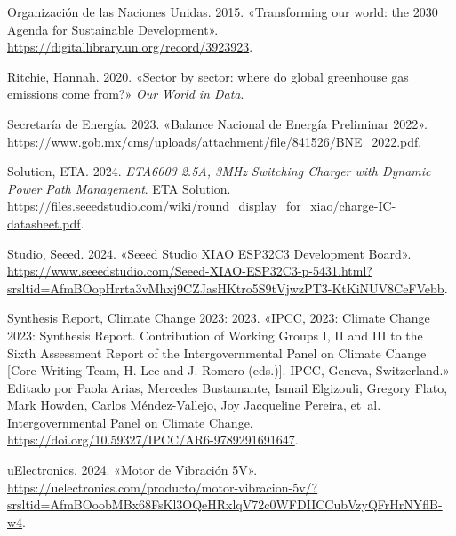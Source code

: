 \documentclass[
  letterpaper,
  DIV=11,
  numbers=noendperiod]{scrreport}
\newlength{\cslhangindent}
\newlength{\cslentryspacingunit} %
\newenvironment{CSLReferences}[2] %
 {%
  \setlength{\parindent}{0pt}
  \ifodd #1
  \let\oldpar\par
  \def\par{\hangindent=\cslhangindent\oldpar}
  \fi
  \setlength{\parskip}{#2\cslentryspacingunit}
 }%
 {}
\begin{document}
\begin{CSLReferences}{1}{0}
\leavevmode{}%
Organización de las Naciones Unidas. 2015. {«Transforming our world: the
2030 Agenda for Sustainable Development»}.
\url{https://digitallibrary.un.org/record/3923923}.

\leavevmode{}%
Ritchie, Hannah. 2020. {«Sector by sector: where do global greenhouse
gas emissions come from?»} \emph{Our World in Data}.

\leavevmode{}%
Secretaría de Energía. 2023. {«Balance Nacional de Energía Preliminar
2022»}.
\url{https://www.gob.mx/cms/uploads/attachment/file/841526/BNE_2022.pdf}.

\leavevmode{}%
Solution, ETA. 2024. \emph{ETA6003 2.5A, 3MHz Switching Charger with
Dynamic Power Path Management}. ETA Solution.
\url{https://files.seeedstudio.com/wiki/round_display_for_xiao/charge-IC-datasheet.pdf}.

\leavevmode{}%
Studio, Seeed. 2024. {«Seeed Studio XIAO ESP32C3 Development Board»}.
\url{https://www.seeedstudio.com/Seeed-XIAO-ESP32C3-p-5431.html?srsltid=AfmBOopHrrta3vMhxj9CZJasHKtro5S9tVjwzPT3-KtKiNUV8CeFVebb}.

\leavevmode{}%
Synthesis Report, Climate Change 2023: 2023. {«IPCC, 2023: Climate
Change 2023: Synthesis Report. Contribution of Working Groups I, II and
III to the Sixth Assessment Report of the Intergovernmental Panel on
Climate Change {[}Core Writing Team, H. Lee and J. Romero (eds.){]}.
IPCC, Geneva, Switzerland.»} Editado por Paola Arias, Mercedes
Bustamante, Ismail Elgizouli, Gregory Flato, Mark Howden, Carlos
Méndez-Vallejo, Joy Jacqueline Pereira, et~al. Intergovernmental Panel
on Climate Change.
\url{https://doi.org/10.59327/IPCC/AR6-9789291691647}.

\leavevmode{}%
uElectronics. 2024. {«Motor de Vibración 5V»}.
\url{https://uelectronics.com/producto/motor-vibracion-5v/?srsltid=AfmBOoobMBx68FsKl3OQeHRxlqV72c0WFDIICCubVzyQFrHrNYflB-w4}.

\end{CSLReferences}
\end{document}
